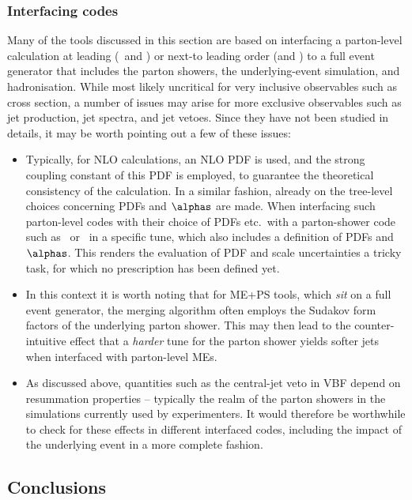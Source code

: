 \subsubsection{Interfacing codes}
Many of the tools discussed in this section are based on interfacing a
parton-level calculation at leading (\alpgen\ and \MGME) or next-to leading 
order (\POWHEGBOX and \MCatNLO) to a full event generator that includes the 
parton showers, the underlying-event simulation, and hadronisation.  While
most likely uncritical for very inclusive observables such as cross section,
a number of issues may arise for more exclusive observables such as jet 
production, jet spectra, and jet vetoes.  Since they have not been studied 
in details, it may be worth pointing out a few of these issues: 
\begin{itemize}
\item Typically, for NLO calculations, an NLO PDF is used, and the strong 
      coupling constant of this PDF is employed, to guarantee the theoretical
      consistency of the calculation.  In a similar fashion, already on the
      tree-level choices concerning PDFs and $\alphas$ are made.  When 
      interfacing such parton-level codes with their choice of PDFs etc.\ 
      with a parton-shower code such as \pythia\ or \herwig\ in a specific 
      tune, which also includes a definition of PDFs and $\alphas$.  
      This renders the evaluation of PDF and scale uncertainties a tricky
      task, for which no prescription has been defined yet.  
\item In this context it is worth noting that for ME+PS tools, which {\em sit} 
      on a full event generator, the merging algorithm often employs the
      Sudakov form factors of the underlying parton shower.  This may then
      lead to the counter-intuitive effect that a {\em harder} tune for the
      parton shower yields softer jets when interfaced with parton-level
      MEs.
\item As discussed above, quantities such as the central-jet veto in VBF
      depend on resummation properties -- typically the realm of the parton 
      showers in the simulations currently used by experimenters.  It would
      therefore be worthwhile to check for these effects in different
      interfaced codes, including the impact of the underlying event in 
      a more complete fashion.  
\end{itemize}

\subsection{Conclusions}

